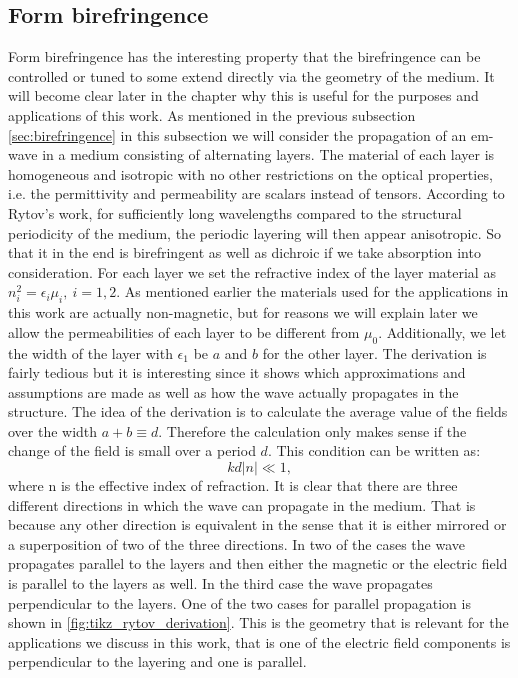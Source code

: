 \subsection{Form birefringence}
\label{sec:form_birefringence}
Form birefringence has the interesting property that the birefringence can be controlled or tuned to some extend directly via the geometry of the medium. It will become clear later in the chapter why this is useful for the purposes and applications of this work. As mentioned in the previous subsection \ref{sec:birefringence} in this subsection we will consider the propagation of an em-wave in a medium consisting of alternating layers. The material of each layer is homogeneous and isotropic with no other restrictions on the optical properties, i.e. the permittivity and permeability are scalars instead of tensors. According to Rytov's work, for sufficiently long wavelengths compared to the structural periodicity of the medium, the periodic layering will then appear anisotropic. So that it in the end is birefringent as well as dichroic if we take absorption into consideration. For each layer we set the refractive index of the layer material as $n_i^2 = \epsilon_i \mu_i, \: i=1,2$. As mentioned earlier the materials used for the applications in this work are actually non-magnetic, but for reasons we will explain later we allow the permeabilities of each layer to be different from $\mu_0$. Additionally, we let the width of the layer with $\epsilon_1$ be $a$ and $b$ for the other layer. The derivation is fairly tedious but it is interesting since it shows which approximations and assumptions are made as well as how the wave actually propagates in the structure. The idea of the derivation is to calculate the average value of the fields over the width $a+b\equiv d$. Therefore the calculation only makes sense if the change of the field is small over a period $d$. This condition can be written as:
\begin{equation}
    \label{eq:rytov_cond1}
    kd|n|\ll 1,
\end{equation}
where n is the effective index of refraction. It is clear that there are three different directions in which the wave can propagate in the medium. That is because any other direction is equivalent in the sense that it is either mirrored or a superposition of two of the three directions. In two of the cases the wave propagates parallel to the layers and then either the magnetic or the electric field is parallel to the layers as well. In the third case the wave propagates perpendicular to the layers. One of the two cases for parallel propagation is shown in \ref{fig:tikz_rytov_derivation}. This is the geometry that is relevant for the applications we discuss in this work, that is one of the electric field components is perpendicular to the layering and one is parallel. 

